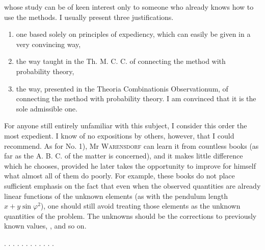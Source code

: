 whose study can be of keen interest only to someone who
already knows how to use the methods. I usually present three
justifications.

\begin{enumerate}
\item[1)] one based solely on principles of expediency, which can easily be given in a very
convincing way,
\item[2)] the way taught in the Th. M. C. C. of connecting the method
with probability theory,
\item[3)] the  way, presented in the Theoria Combinationis
Observationum, of connecting the method with probability theory. I am convinced
that it is the sole
admissible one.
\end{enumerate}

For anyone still entirely unfamiliar with this subject, I consider this
order the most expedient. I know of no expositions by others, however,
that I could recommend. As for No. 1), Mr
\textsc{Warensdorf} can learn it from countless books (as far as the A. B. C. of the matter
is concerned), and it makes little difference which he chooses, provided he later
takes the opportunity to improve for himself what almost all of them do poorly.
For example, these books do not place sufficient emphasis on the fact
that even when the observed quantities are already linear
functions of the unknown elements (as with the pendulum length
$x+y\sin\varphi^2$), one should still avoid treating those elements as the unknown
quantities of the problem. The unknowns should be the corrections to previously known values,
, and so on.

. . . . . . . . . . . .
